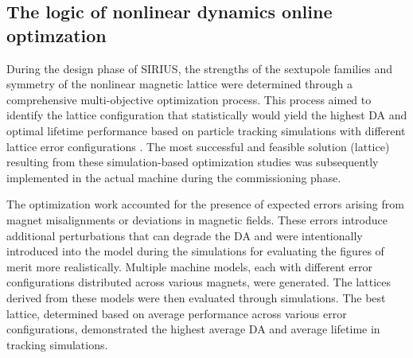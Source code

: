 \subsection{The logic of nonlinear dynamics online optimzation}
During the design phase of SIRIUS, the strengths of the sextupole families and symmetry of the nonlinear magnetic lattice were determined through a comprehensive multi-objective optimization process. This process aimed to identify the lattice configuration that statistically would yield the highest \gls*{DA} and optimal lifetime performance based on particle tracking simulations  with different lattice error configurations \cite{de_sa_optimization_2016}. The most successful and feasible solution (lattice) resulting from these simulation-based optimization studies was subsequently implemented in the actual machine during the commissioning phase.

The optimization work accounted for the presence of expected errors arising from magnet misalignments or deviations in magnetic fields. These errors introduce additional perturbations that can degrade the \gls*{DA} and were intentionally introduced into the model during the simulations for evaluating the figures of merit more realistically. Multiple machine models, each with different error configurations distributed across various magnets, were generated. The lattices derived from these models were then evaluated through simulations. The best lattice, determined based on average performance across various error configurations, demonstrated the highest average \gls*{DA} and average lifetime in tracking simulations.

